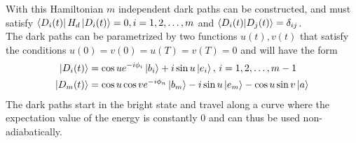 With this Hamiltonian $m$ independent dark paths can be constructed, and must satisfy $\bra{D_i(t)}H_d\ket{D_i(t)} = 0, i = 1,2,\dots,m$ and $\bra{D_i(t)}\ket{D_j(t)} = \delta_{ij}$.\\
The dark paths can be parametrized by two functions $u(t),v(t)$ that satisfy the conditions $u(0) = v(0) = u(T) = v(T) = 0$ and  will have the form
\begin{equation}
\begin{aligned}
\ket{D_i(t)} &= \cos u e^{-i\phi_i}\ket{b_i} + i\sin u \ket{e_i},\, i = 1,2,\dots,m-1
\\
\ket{D_m(t)} &= \cos u \cos v e^{-i\phi_n}\ket{b_m} - i\sin u \ket{e_m} - \cos u \sin v \ket{a}
\end{aligned}
\end{equation}
The dark paths start in the bright state and travel along a curve where the expectation value of the energy is constantly $0$ and can thus be used non-adiabatically.

